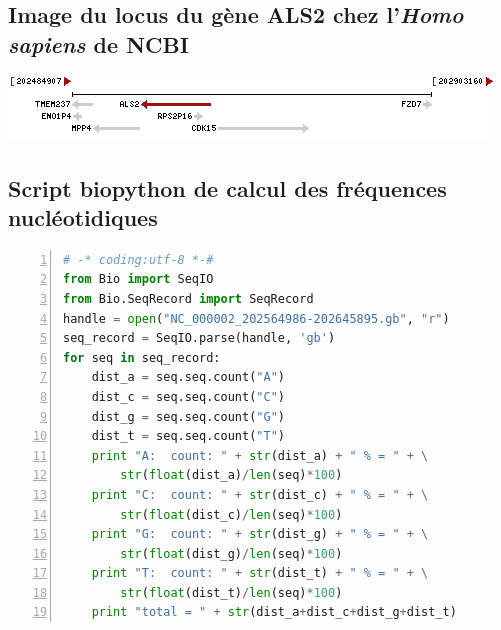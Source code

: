 \documentclass[10.9pt]{article} %
\begin{document}
\subsection{Image du locus du gène ALS2 chez l'\emph{Homo sapiens} de NCBI}\label{2}
\includegraphics{annexes/question_1/annexe1_ncbi_als2.png}

\subsection{Script biopython de calcul des fréquences nucléotidiques}\label{3}
\begin{lstlisting}[frame=single,numbers=left,language=Python]
# -* coding:utf-8 *-#
from Bio import SeqIO
from Bio.SeqRecord import SeqRecord
handle = open("NC_000002_202564986-202645895.gb", "r")
seq_record = SeqIO.parse(handle, 'gb')
for seq in seq_record:
    dist_a = seq.seq.count("A")
    dist_c = seq.seq.count("C")
    dist_g = seq.seq.count("G")
    dist_t = seq.seq.count("T")
    print "A:  count: " + str(dist_a) + " % = " + \
        str(float(dist_a)/len(seq)*100)
    print "C:  count: " + str(dist_c) + " % = " + \
        str(float(dist_c)/len(seq)*100)
    print "G:  count: " + str(dist_g) + " % = " + \
        str(float(dist_g)/len(seq)*100)
    print "T:  count: " + str(dist_t) + " % = " + \
        str(float(dist_t)/len(seq)*100)
    print "total = " + str(dist_a+dist_c+dist_g+dist_t)
\end{lstlisting}
\end{document}
